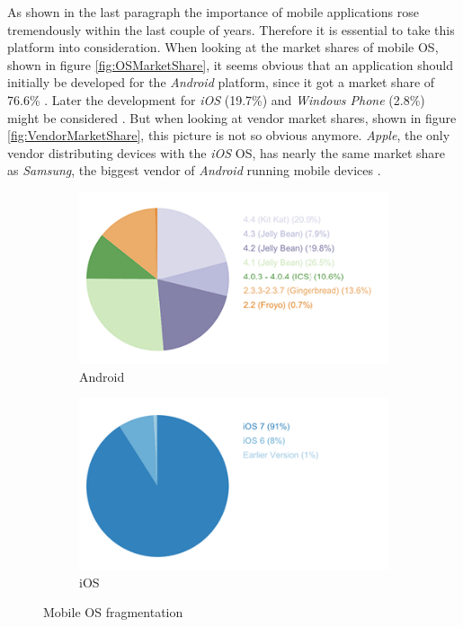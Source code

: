 As shown in the last paragraph the importance of mobile applications rose tremendously within the last couple of years. Therefore it is essential to take this platform into consideration. When looking at the market shares of mobile \acrlong{OS}, shown in figure \vref{fig:OSMarketShare}, it seems obvious that an application should initially be developed for the \emph{Android} platform, since it got a market share of 76.6\% \cite{IDC:2015aa}. Later the development for \emph{iOS} (19.7\%) and \emph{Windows Phone} (2.8\%) might be considered \cite{IDC:2015aa}. But when looking at vendor market shares, shown in figure \vref{fig:VendorMarketShare}, this picture is not so obvious anymore. \emph{Apple}, the only vendor distributing devices with the \emph{iOS} \acrlong{OS}, has nearly the same market share as \emph{Samsung}, the biggest vendor of \emph{Android} running mobile devices \cite{IDC:2015ab}.

\begin{figure}[h]
	\centering
	\begin{subfigure}{.49\textwidth}
  		\centering
  		\includegraphics[width=0.98\linewidth]{./images/android-os.png}
  		\caption{Android}
  		\label{fig:AndroidOSFragmentation}
	\end{subfigure}
	\begin{subfigure}{.49\textwidth}
  		\centering
  		\includegraphics[width=0.98\linewidth]{./images/ios-os.png}
  		\caption{iOS}
  		\label{fig:iOSOSFragmentation}
	\end{subfigure}
	\caption[Mobile \acrfull{OS} fragmentation, retrieved from \cite{OpenSignal:2014aa}]{Mobile \acrfull{OS} fragmentation}
	\label{fig:MobileOSFragmentation}
\end{figure}
\nocite{OpenSignal:2014aa}

